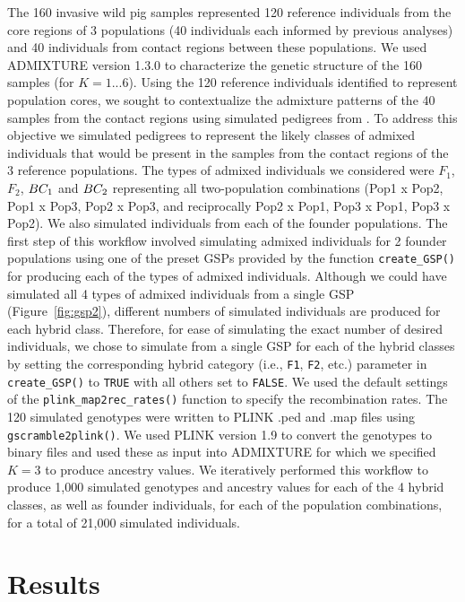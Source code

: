 {The 160 invasive wild pig samples represented 120 reference individuals from the core regions of
3 populations (40 individuals each informed by previous analyses)
and 40 individuals from contact regions between these populations.
We used ADMIXTURE version 1.3.0 \citep{alexander2009fast} to characterize the genetic structure
of the 160 samples (for $K = {1...6}$). Using the 120 reference individuals identified to represent population cores,
we sought to contextualize the admixture patterns of the 40 samples
from the contact regions using simulated pedigrees from \gscramble{}. To address this objective we simulated
pedigrees to represent the likely classes of admixed individuals that would be present in the samples
from the contact regions of the 3 reference populations. The types of admixed individuals we considered were
$F_1$, $F_2$, $BC_1$ and $BC_2$ representing all two-population combinations
(Pop1 x Pop2, Pop1 x Pop3, Pop2 x Pop3, and reciprocally Pop2 x Pop1, Pop3 x Pop1, Pop3 x Pop2).
We also simulated individuals from each of the founder populations. The first step of this workflow involved
simulating admixed individuals for 2 founder populations using one of the preset \gscramble{}
GSPs provided by the function {\footnotesize\tt create\_GSP()} for producing each of the types of admixed
individuals. Although we could have simulated all 4 types of admixed individuals from a single GSP (Figure~\ref{fig:gsp2}),
different numbers of simulated individuals are produced for each hybrid class. Therefore, for ease of simulating the exact number of desired individuals, we chose to simulate from
a single GSP for each of the hybrid classes by setting the corresponding hybrid category (i.e., {\tt F1}, {\tt F2}, etc.) parameter in {\footnotesize\tt create\_GSP()} to {\footnotesize\tt TRUE} with all others set to {\footnotesize\tt FALSE}. We used the default settings of the {\footnotesize\tt plink\_map2rec\_rates()}  function to specify the recombination rates. The 120 simulated genotypes were written to PLINK .ped and .map files using {\footnotesize\tt gscramble2plink()}. We used PLINK version 1.9 \citep{purcell2007plink} to convert the genotypes to binary files and used these as input into ADMIXTURE for which we specified $K=3$ to produce ancestry values. We iteratively
performed this workflow to produce 1,000 simulated genotypes and ancestry values for each of the
4 hybrid classes, as well as founder individuals, for each of the population combinations, for a total of
21,000 simulated individuals.

\section*{Results}

}
